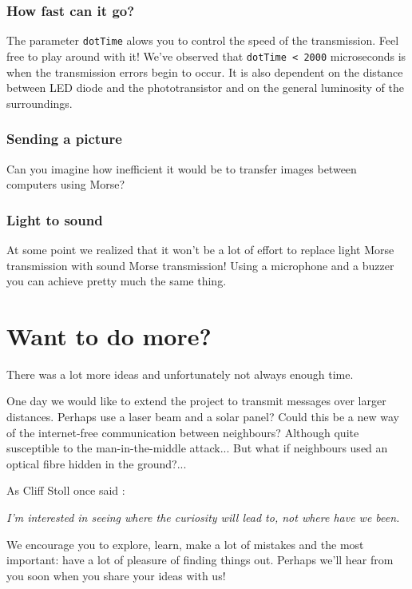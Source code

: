 \documentclass[10pt]{report}
\begin{document}
\subsubsection{How fast can it go?}

The parameter \verb|dotTime| alows you to control the speed of the transmission. Feel free to play around with it! We've observed that \verb|dotTime < 2000| microseconds is when the transmission errors begin to occur. It is also dependent on the distance between LED diode and the phototransistor and on the general luminosity of the surroundings.

\subsubsection{Sending a picture}

Can you imagine how inefficient it would be to transfer images between computers using Morse?

\subsubsection{Light to sound}

At some point we realized that it won't be a lot of effort to replace light Morse transmission with sound Morse transmission! Using a microphone and a buzzer you can achieve pretty much the same thing.

\section{Want to do more?}

There was a lot more ideas and unfortunately not always enough time.

One day we would like to extend the project to transmit messages over larger distances. Perhaps use a laser beam and a solar panel? Could this be a new way of the internet-free communication between neighbours? Although quite susceptible to the man-in-the-middle attack... But what if neighbours used an optical fibre hidden in the ground?...

As Cliff Stoll once said \cite{cliff_stoll}: 

\textit{I'm interested in seeing where the curiosity will lead to, not where have we been.}

We encourage you to explore, learn, make a lot of mistakes and the most important: have a lot of pleasure of finding things out. Perhaps we'll hear from you soon when you share your ideas with us!
\end{document}
